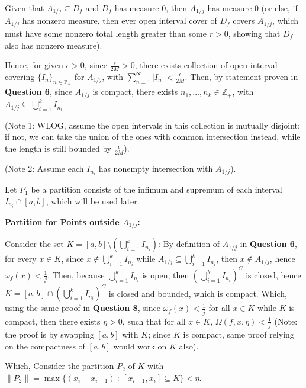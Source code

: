\documentclass{article}
\begin{document}
\begin{itemize}
    \hfill

    Given that $A_{1/j}\subseteq D_f$ and $D_f$ has measure $0$, then $A_{1/j}$ has measure $0$ (or else, if $A_{1/j}$ has nonzero measure, then ever open interval cover of $D_f$ covers $A_{1/j}$, which must have some nonzero total length greater than some $r>0$, showing that $D_f$ also has nonzero measure).

    Hence, for given $\epsilon>0$, since $\frac{\epsilon}{2M}>0$, there exists collection of open interval covering $\{I_n\}_{n\in\mathbb{Z}_+}$ for $A_{1/j}$, with $\sum_{n=1}^{\infty}|I_n|<\frac{\epsilon}{2M}$.
    Then, by statement proven in \textbf{Question 6}, since $A_{1/j}$ is compact, there exists $n_1,...,n_k\in\mathbb{Z}_+$, with $A_{1/j}\subseteq \bigcup_{i=1}^{k}I_{n_i}$ 
    
    (Note 1: WLOG, assume the open intervals in this collection is mutually disjoint; if not, we can take the union of the ones with common intersection instead, while the length is still bounded by $\frac{\epsilon}{2M}$).
    
    (Note 2: Assume each $I_{n_i}$ has nonempty intersection with $A_{1/j}$).

    Let $P_1$ be a partition consists of the infimum and supremum of each interval $I_{n_i}\cap [a,b]$, which will be used later.

    \hfill

    \textbf{Partition for Points outside $A_{1/j}$:}

    Consider the set $K=[a,b]\setminus (\bigcup_{i=1}^{k} I_{n_i})$: By definition of $A_{1/j}$ in \textbf{Question 6}, for every $x\in K$, since $x\notin \bigcup_{i=1}^{k} I_{n_i}$ while $A_{1/j}\subseteq \bigcup_{i=1}^{k} I_{n_i}$, then $x\notin A_{1/j}$, hence $\omega_f(x)<\frac{1}{j}$.
    Then, because $\bigcup_{i=1}^{k} I_{n_i}$ is open, then $\left(\bigcup_{i=1}^{k} I_{n_i}\right)^C$ is closed, hence $K=[a,b]\cap \left(\bigcup_{i=1}^{k} I_{n_i}\right)^C$ is closed and bounded, which is compact.
    Which, using the same proof in \textbf{Question 8}, since $\omega_f(x)<\frac{1}{j}$ for all $x\in K$ while $K$ is compact, then there exists $\eta>0$, such that for all $x\in K$,
    $\Omega(f,x,\eta)<\frac{1}{j}$ (Note: the proof is by swapping $[a,b]$ with $K$; since $K$ is compact, same proof relying on the compactness of $[a,b]$ would work on $K$ also).

    Which, Consider the partition $P_2$ of $K$ with $\|P_2\|=\max\{(x_i-x_{i-1})\ :\ [x_{i-1},x_i]\subseteq K\}<\eta$.


\end{itemize}
\end{document}
